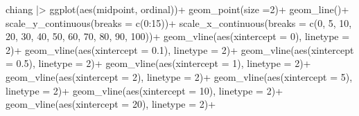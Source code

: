 \documentclass[
  letterpaper,
]{book}
\newenvironment{Shaded}{\begin{snugshade}}{\end{snugshade}}
\newcommand{\AttributeTok}[1]{\textcolor[rgb]{0.40,0.45,0.13}{#1}}
\newcommand{\DecValTok}[1]{\textcolor[rgb]{0.68,0.00,0.00}{#1}}
\newcommand{\FloatTok}[1]{\textcolor[rgb]{0.68,0.00,0.00}{#1}}
\newcommand{\FunctionTok}[1]{\textcolor[rgb]{0.28,0.35,0.67}{#1}}
\newcommand{\NormalTok}[1]{\textcolor[rgb]{0.00,0.23,0.31}{#1}}
\newcommand{\SpecialCharTok}[1]{\textcolor[rgb]{0.37,0.37,0.37}{#1}}
\begin{document}
\begin{Shaded}
\begin{Highlighting}[]
\NormalTok{chiang }\SpecialCharTok{|\textgreater{}} 
  \FunctionTok{ggplot}\NormalTok{(}\FunctionTok{aes}\NormalTok{(midpoint, ordinal))}\SpecialCharTok{+}
  \FunctionTok{geom\_point}\NormalTok{(}\AttributeTok{size =}\DecValTok{2}\NormalTok{)}\SpecialCharTok{+}
  \FunctionTok{geom\_line}\NormalTok{()}\SpecialCharTok{+}
  \FunctionTok{scale\_y\_continuous}\NormalTok{(}\AttributeTok{breaks =} \FunctionTok{c}\NormalTok{(}\DecValTok{0}\SpecialCharTok{:}\DecValTok{15}\NormalTok{))}\SpecialCharTok{+}
  \FunctionTok{scale\_x\_continuous}\NormalTok{(}\AttributeTok{breaks =} \FunctionTok{c}\NormalTok{(}\DecValTok{0}\NormalTok{, }\DecValTok{5}\NormalTok{, }\DecValTok{10}\NormalTok{, }\DecValTok{20}\NormalTok{, }\DecValTok{30}\NormalTok{, }\DecValTok{40}\NormalTok{, }\DecValTok{50}\NormalTok{, }\DecValTok{60}\NormalTok{, }\DecValTok{70}\NormalTok{, }\DecValTok{80}\NormalTok{, }\DecValTok{90}\NormalTok{, }\DecValTok{100}\NormalTok{))}\SpecialCharTok{+}
  \FunctionTok{geom\_vline}\NormalTok{(}\FunctionTok{aes}\NormalTok{(}\AttributeTok{xintercept =} \DecValTok{0}\NormalTok{), }\AttributeTok{linetype =} \DecValTok{2}\NormalTok{)}\SpecialCharTok{+}
  \FunctionTok{geom\_vline}\NormalTok{(}\FunctionTok{aes}\NormalTok{(}\AttributeTok{xintercept =} \FloatTok{0.1}\NormalTok{), }\AttributeTok{linetype =} \DecValTok{2}\NormalTok{)}\SpecialCharTok{+}
  \FunctionTok{geom\_vline}\NormalTok{(}\FunctionTok{aes}\NormalTok{(}\AttributeTok{xintercept =} \FloatTok{0.5}\NormalTok{), }\AttributeTok{linetype =} \DecValTok{2}\NormalTok{)}\SpecialCharTok{+}
  \FunctionTok{geom\_vline}\NormalTok{(}\FunctionTok{aes}\NormalTok{(}\AttributeTok{xintercept =} \DecValTok{1}\NormalTok{), }\AttributeTok{linetype =} \DecValTok{2}\NormalTok{)}\SpecialCharTok{+}
  \FunctionTok{geom\_vline}\NormalTok{(}\FunctionTok{aes}\NormalTok{(}\AttributeTok{xintercept =} \DecValTok{2}\NormalTok{), }\AttributeTok{linetype =} \DecValTok{2}\NormalTok{)}\SpecialCharTok{+}
  \FunctionTok{geom\_vline}\NormalTok{(}\FunctionTok{aes}\NormalTok{(}\AttributeTok{xintercept =} \DecValTok{5}\NormalTok{), }\AttributeTok{linetype =} \DecValTok{2}\NormalTok{)}\SpecialCharTok{+}
  \FunctionTok{geom\_vline}\NormalTok{(}\FunctionTok{aes}\NormalTok{(}\AttributeTok{xintercept =} \DecValTok{10}\NormalTok{), }\AttributeTok{linetype =} \DecValTok{2}\NormalTok{)}\SpecialCharTok{+}
  \FunctionTok{geom\_vline}\NormalTok{(}\FunctionTok{aes}\NormalTok{(}\AttributeTok{xintercept =} \DecValTok{20}\NormalTok{), }\AttributeTok{linetype =} \DecValTok{2}\NormalTok{)}\SpecialCharTok{+}

\end{Highlighting}
\end{Shaded}
\end{document}
